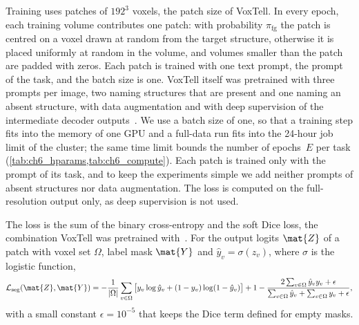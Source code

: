 Training uses patches of $192^3$ voxels, the patch size of VoxTell.
In every epoch, each training volume contributes one patch: with probability $\pi_{\mathrm{fg}}$ the patch is centred on a voxel drawn at random from the target structure, otherwise it is placed uniformly at random in the volume, and volumes smaller than the patch are padded with zeros.
Each patch is trained with one text prompt, the prompt of the task, and the batch size is one.
VoxTell itself was pretrained with three prompts per image, two naming structures that are present and one naming an absent structure, with data augmentation and with deep supervision of the intermediate decoder outputs~\cite{rokuss2025voxtellfreetextpromptableuniversal}.
We use a batch size of one, so that a training step fits into the memory of one GPU and a full-data run fits into the 24-hour job limit of the cluster; the same time limit bounds the number of epochs~$E$ per task (\cref{tab:ch6_hparams,tab:ch6_compute}).
Each patch is trained only with the prompt of its task, and to keep the experiments simple we add neither prompts of absent structures nor data augmentation.
The loss is computed on the full-resolution output only, as deep supervision is not used.

The loss is the sum of the binary cross-entropy and the soft Dice loss, the combination VoxTell was pretrained with~\cite{rokuss2025voxtellfreetextpromptableuniversal}.
For the output logits $\mat{Z}$ of a patch with voxel set $\Omega$, label mask $\mat{Y}$ and $\hat{y}_v = \sigma(z_v)$, where $\sigma$ is the logistic function,
\begin{equation}
\mathcal{L}_{\mathrm{seg}}(\mat{Z}, \mat{Y}) =
-\frac{1}{|\Omega|} \sum_{v \in \Omega} \big[ y_v \log \hat{y}_v + (1 - y_v) \log(1 - \hat{y}_v) \big]
+ 1 - \frac{2 \sum_{v \in \Omega} \hat{y}_v y_v + \epsilon}{\sum_{v \in \Omega} \hat{y}_v + \sum_{v \in \Omega} y_v + \epsilon},
\label{eq:method-seg-loss}
\end{equation}
with a small constant $\epsilon = 10^{-5}$ that keeps the Dice term defined for empty masks.

